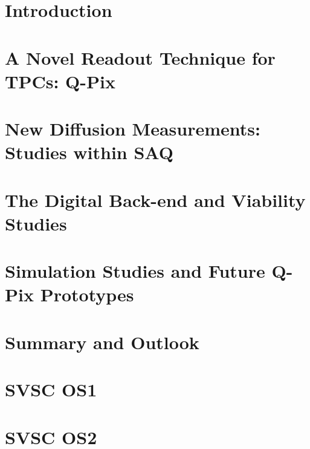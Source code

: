 \documentclass[12pt]{uh_thesis}
\begin{document}
\tableofcontents
\listoffigures
\listoftables
\printnomenclature

\mainmatter

\chapter{Introduction}
\label{chap:intro}



\chapter{A Novel Readout Technique for TPCs: Q-Pix}
\label{chap:qpix}




\chapter{New Diffusion Measurements: Studies within SAQ}
\label{chap:saq}



\chapter{The Digital Back-end and Viability Studies}
\label{chap:qdb}



\chapter{Simulation Studies and Future Q-Pix Prototypes}



\chapter{Summary and Outlook}
\label{chap:summary}




\printbibliography

\appendix
\chapter{SVSC OS1}
\label{chap:OS1}



\chapter{SVSC OS2}
\label{chap:OS2}



\printindex
\end{document}
